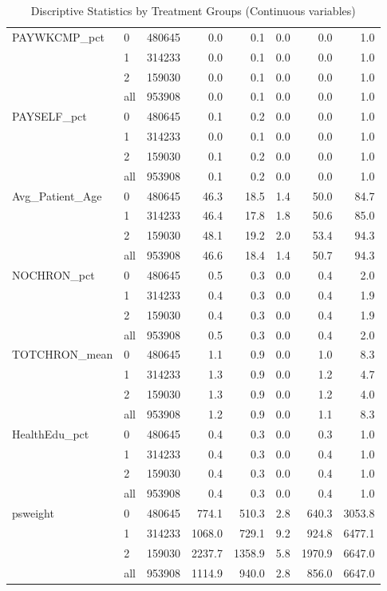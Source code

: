 \begin{table}[ht]
{\begin{tabular}{llrrrrrr}
   \hline
PAYWKCMP\_pct & 0 & 480645 &    0.0 &    0.1 & 0.0 &    0.0 &    1.0 \\ 
   & 1 & 314233 &    0.0 &    0.1 & 0.0 &    0.0 &    1.0 \\ 
   & 2 & 159030 &    0.0 &    0.1 & 0.0 &    0.0 &    1.0 \\ 
   \hline
 & all & 953908 &    0.0 &    0.1 & 0.0 &    0.0 &    1.0 \\ 
   \hline
PAYSELF\_pct & 0 & 480645 &    0.1 &    0.2 & 0.0 &    0.0 &    1.0 \\ 
   & 1 & 314233 &    0.0 &    0.1 & 0.0 &    0.0 &    1.0 \\ 
   & 2 & 159030 &    0.1 &    0.2 & 0.0 &    0.0 &    1.0 \\ 
   \hline
 & all & 953908 &    0.1 &    0.2 & 0.0 &    0.0 &    1.0 \\ 
   \hline
Avg\_Patient\_Age & 0 & 480645 &   46.3 &   18.5 & 1.4 &   50.0 &   84.7 \\ 
   & 1 & 314233 &   46.4 &   17.8 & 1.8 &   50.6 &   85.0 \\ 
   & 2 & 159030 &   48.1 &   19.2 & 2.0 &   53.4 &   94.3 \\ 
   \hline
 & all & 953908 &   46.6 &   18.4 & 1.4 &   50.7 &   94.3 \\ 
   \hline
NOCHRON\_pct & 0 & 480645 &    0.5 &    0.3 & 0.0 &    0.4 &    2.0 \\ 
   & 1 & 314233 &    0.4 &    0.3 & 0.0 &    0.4 &    1.9 \\ 
   & 2 & 159030 &    0.4 &    0.3 & 0.0 &    0.4 &    1.9 \\ 
   \hline
 & all & 953908 &    0.5 &    0.3 & 0.0 &    0.4 &    2.0 \\ 
   \hline
TOTCHRON\_mean & 0 & 480645 &    1.1 &    0.9 & 0.0 &    1.0 &    8.3 \\ 
   & 1 & 314233 &    1.3 &    0.9 & 0.0 &    1.2 &    4.7 \\ 
   & 2 & 159030 &    1.3 &    0.9 & 0.0 &    1.2 &    4.0 \\ 
   \hline
 & all & 953908 &    1.2 &    0.9 & 0.0 &    1.1 &    8.3 \\ 
   \hline
HealthEdu\_pct & 0 & 480645 &    0.4 &    0.3 & 0.0 &    0.3 &    1.0 \\ 
   & 1 & 314233 &    0.4 &    0.3 & 0.0 &    0.4 &    1.0 \\ 
   & 2 & 159030 &    0.4 &    0.3 & 0.0 &    0.4 &    1.0 \\ 
   \hline
 & all & 953908 &    0.4 &    0.3 & 0.0 &    0.4 &    1.0 \\ 
   \hline
psweight & 0 & 480645 &  774.1 &  510.3 & 2.8 &  640.3 & 3053.8 \\ 
   & 1 & 314233 & 1068.0 &  729.1 & 9.2 &  924.8 & 6477.1 \\ 
   & 2 & 159030 & 2237.7 & 1358.9 & 5.8 & 1970.9 & 6647.0 \\ 
   \hline
 & all & 953908 & 1114.9 &  940.0 & 2.8 &  856.0 & 6647.0 \\ 
   \hline
\end{tabular}
}
\caption{Discriptive Statistics by Treatment Groups (Continuous variables)} 
\label{tab:descriptive.2}
\end{table}
